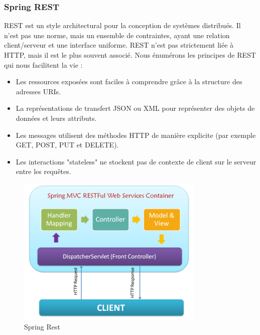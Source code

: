 \subsubsection*{Spring REST}
REST est un style architectural pour la conception de syst\`emes distribu\'es. Il n'est pas une norme, mais un ensemble de contraintes, ayant une relation client/serveur et une interface uniforme. REST n'est pas strictement li\'ee à HTTP, mais il est le plus souvent associ\'e. Nous \'enum\'erons les principes de REST qui nous facilitent la vie :
\begin{itemize}
\item Les ressources expos\'ees sont faciles \`a comprendre gr\^ace \`a la structure des adresses URIs. 
\item La repr\'esentations de transfert JSON ou XML pour repr\'esenter des objets de donn\'ees et leurs attributs. 
\item Les messages utilisent des m\'ethodes HTTP de mani\`ere explicite (par exemple GET, POST, PUT et DELETE). 
\item Les interactions "stateless" ne stockent pas de contexte de client sur le serveur entre les requ\^etes.

\end{itemize}
\begin{figure}[!ht]\centering
\includegraphics[width=0.8\textwidth]{chapitres/chapitrex/figures/springRest.png}
\caption{Spring Rest }
\label{fig:springRest}
\end{figure}
